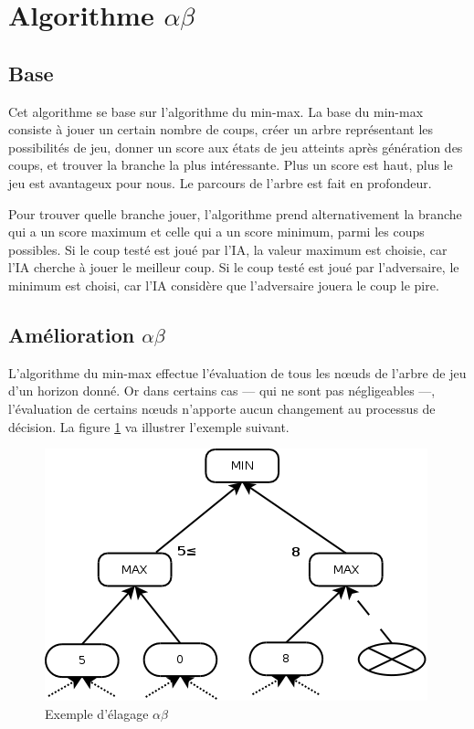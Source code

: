 \documentclass[11pt,a4paper,titlepage,french]{article}
\begin{document}
	\section[Algorithme alpha beta]{Algorithme $\alpha\beta$}
	\label{alphab}
		\subsection{Base}
			Cet algorithme se base sur l'algorithme du min-max. La base du min-max consiste à jouer un certain nombre de coups, créer un arbre représentant les possibilités de jeu, donner un score aux états de jeu atteints après génération des coups, et trouver la branche la plus intéressante. Plus un score est haut, plus le jeu est avantageux pour nous. Le parcours de l'arbre est fait en profondeur.

			Pour trouver quelle branche jouer, l'algorithme prend alternativement la branche qui a un score maximum et celle qui a un score minimum, parmi les coups possibles. Si le coup testé est joué par l'IA, la valeur maximum est choisie, car l'IA cherche à jouer le meilleur coup. Si le coup testé est joué par l'adversaire, le minimum est choisi, car l'IA considère que l'adversaire jouera le coup le pire.

		\subsection[Amélioration]{Amélioration $\alpha\beta$}

				L'algorithme du min-max effectue l'évaluation de tous les nœuds de l'arbre de jeu d'un horizon donné. Or dans certains cas --- qui ne sont pas négligeables ---, l'évaluation de certains nœuds n'apporte aucun changement au processus de décision. La figure \ref{abex} va illustrer l'exemple suivant.

				\begin{figure}[hbt]
					\label{abex}
					\begin{center}
						\includegraphics[width=\textwidth]{./alphabeta.png}
					\end{center}
					\caption{Exemple d'élagage $\alpha\beta$}
				\end{figure}
\end{document}
